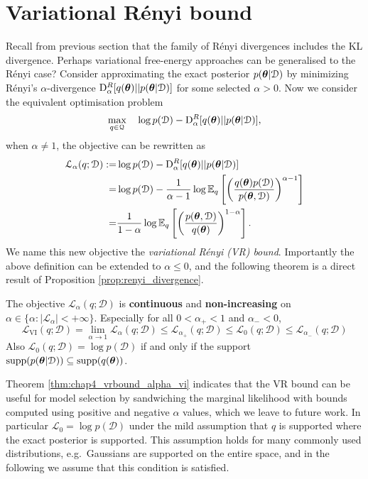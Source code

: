 \section{Variational R{\'e}nyi bound}
\label{sec:vr_bound}
Recall from previous section that the family of R{\'e}nyi divergences includes the KL divergence. Perhaps variational free-energy approaches can be generalised to the R{\'e}nyi case? Consider approximating the exact posterior $p(\bm{\theta}|\mathcal{D})$ by minimizing R{\'e}nyi's $\alpha$-divergence $\mathrm{D}_{\alpha}^{R}[q(\bm{\theta}) || p(\bm{\theta} | \mathcal{D})]$ for some selected $\alpha > 0$.
%
Now we consider the equivalent optimisation problem 
$$\max_{q \in \mathcal{Q}} \quad  \log p(\mathcal{D}) - \mathrm{D}_{\alpha}^{R}[q(\bm{\theta}) || p(\bm{\theta} | \mathcal{D})],$$
when $\alpha \neq 1$, the objective can be rewritten as
\begin{equation}
\begin{aligned}
\mathcal{L}_{\alpha}(q; \mathcal{D}) := & \log p(\mathcal{D}) - \mathrm{D}_{\alpha}^{R}[q(\bm{\theta}) || p(\bm{\theta} | \mathcal{D})] \\
= & \log p(\mathcal{D}) - \frac{1}{\alpha - 1} \log \mathbb{E}_{q} \left[ \left( \frac{q(\bm{\theta}) p(\mathcal{D})}{p(\bm{\theta}, \mathcal{D})} \right)^{\alpha - 1} \right] \\
= & \frac{1}{1 - \alpha} \log \mathbb{E}_{q} \left[ \left( \frac{p(\bm{\theta}, \mathcal{D})}{q(\bm{\theta})} \right)^{1 - \alpha} \right].
\end{aligned}
\label{eq:chap4_vrbound_exact_bound}
\end{equation}
%
We name this new objective the \emph{variational R{\'e}nyi (VR) bound}. Importantly the above definition can be extended to $\alpha \leq 0$, and the following theorem is a direct result of Proposition \ref{prop:renyi_divergence}.
\begin{theorem}
\label{thm:chap4_vrbound_alpha_vi}
The objective $\mathcal{L}_{\alpha}(q; \mathcal{D})$ is \textbf{continuous} and \textbf{non-increasing} on $\alpha \in \{\alpha: |\mathcal{L}_{\alpha}| < +\infty \}$. Especially for all $0 < \alpha_{+} < 1$ and $\alpha_{-} < 0$,
\begin{equation*}
\mathcal{L}_{\text{VI}}(q; \mathcal{D}) = \lim_{\alpha \rightarrow 1} \mathcal{L}_{\alpha}(q; \mathcal{D}) 
 \leq \mathcal{L}_{\alpha_{+}}(q; \mathcal{D}) \leq \mathcal{L}_{0}(q; \mathcal{D}) \leq \mathcal{L}_{\alpha_{-}}(q; \mathcal{D})
\end{equation*}
Also $\mathcal{L}_{0}(q; \mathcal{D}) = \log p(\mathcal{D})$ if and only if the support $ \mathrm{supp}(p(\bm{\theta}|\mathcal{D})) \subseteq  \mathrm{supp}(q(\bm{\theta})) $.
\end{theorem}
%
Theorem \ref{thm:chap4_vrbound_alpha_vi} indicates that the VR bound can be useful for model selection by sandwiching the marginal likelihood with bounds computed using positive and negative $\alpha$ values, which we leave to future work. In particular $\mathcal{L}_{0} = \log p(\mathcal{D})$ under the mild assumption that $q$ is supported where the exact posterior is supported. This assumption holds for many commonly used distributions, e.g.~Gaussians are supported on the entire space, and in the following we assume that this condition is satisfied. 

